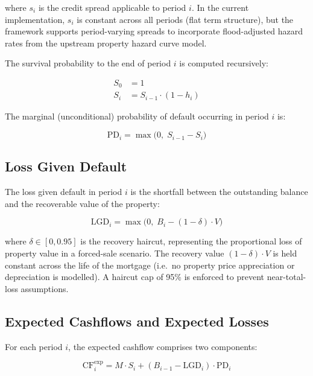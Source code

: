 \documentclass[11pt,a4paper]{article}
\begin{document}
\noindent where $s_i$ is the credit spread applicable to period $i$. In the current
implementation, $s_i$ is constant across all periods (flat term structure), but the
framework supports period-varying spreads to incorporate flood-adjusted hazard rates from
the upstream property hazard curve model.

The survival probability to the end of period $i$ is computed recursively:

\begin{align}
S_0 &= 1 \label{eq:surv_init} \\
S_i &= S_{i-1} \cdot (1 - h_i) \label{eq:surv_recurse}
\end{align}

\noindent The marginal (unconditional) probability of default occurring in period $i$ is:

\begin{equation}
\label{eq:default_prob}
\text{PD}_i = \max\!\bigl(0,\; S_{i-1} - S_i\bigr)
\end{equation}

\subsection{Loss Given Default}
\label{sec:lgd}

The loss given default in period $i$ is the shortfall between the outstanding balance and
the recoverable value of the property:

\begin{equation}
\label{eq:lgd}
\text{LGD}_i = \max\!\bigl(0,\; B_i - (1 - \delta) \cdot V\bigr)
\end{equation}

\noindent where $\delta \in [0, 0.95]$ is the recovery haircut, representing the
proportional loss of property value in a forced-sale scenario. The recovery value
$(1 - \delta) \cdot V$ is held constant across the life of the mortgage (i.e.\ no
property price appreciation or depreciation is modelled). A haircut cap of 95\% is
enforced to prevent near-total-loss assumptions.

\subsection{Expected Cashflows and Expected Losses}

For each period $i$, the expected cashflow comprises two components:

\begin{equation}
\label{eq:expected_cf}
\text{CF}_i^{\text{exp}} = M \cdot S_i + (B_{i-1} - \text{LGD}_i) \cdot \text{PD}_i
\end{equation}
\end{document}
